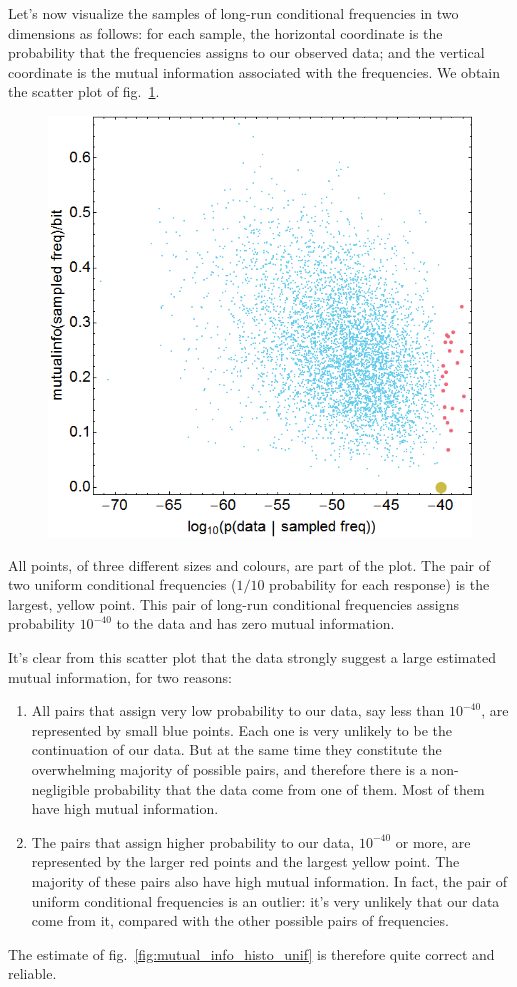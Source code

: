 \documentclass[\ifafour a4paper,12pt,\else a5paper,10pt,\fi%
onecolumn,oneside,article,%
british%
]{memoir}
\theoremstyle{remark}
\theoremstyle{innote}
\renewcommand*{\|}{\nonscript\,\vert\nonscript\;\mathopen{}}
\newcommand*{\fig}{fig.}%
\begin{document}
Let's now visualize the samples of long-run conditional frequencies in two
dimensions as follows: for each sample, the horizontal coordinate is the
probability that the frequencies assigns to our observed data; and the
vertical coordinate is the mutual information associated with the
frequencies. We obtain the scatter plot of
\fig~\ref{fig:init_scatter_unif}.
\begin{figure}[h!]
\centering\includegraphics[width=0.75\linewidth]{A_init_scatter.png}\\
\caption{}\label{fig:init_scatter_unif}
\end{figure}%
All points, of three different sizes and colours, are part of the plot. The
pair of two uniform conditional frequencies ($1/10$ probability for each
response) is the largest, yellow point. This pair of long-run conditional
frequencies assigns probability $10^{-40}$ to the data and has zero mutual
information.

It's clear from this scatter plot that the data strongly suggest a large
estimated mutual information, for two reasons:
\begin{enumerate}[label=\arabic*.]
\item All pairs that assign very low probability to our data, say less than
  $10^{-40}$, are represented by small blue points. Each one is very
  unlikely to be the continuation of our data. But at the same time they
  constitute the overwhelming majority of possible pairs, and therefore
  there is a non-negligible probability that the data come from one of
  them. Most of them have high mutual information.
\item The pairs that assign higher probability to our data, $10^{-40}$ or
  more, are represented by the larger red points and the largest yellow
  point. The majority of these pairs also have high mutual information. In
  fact, the pair of uniform conditional frequencies is an outlier: it's
  very unlikely that our data come from it, compared with the other
  possible pairs of frequencies.
\end{enumerate}
The estimate of \fig~\ref{fig:mutual_info_histo_unif} is therefore quite
correct and reliable.
\end{document}
